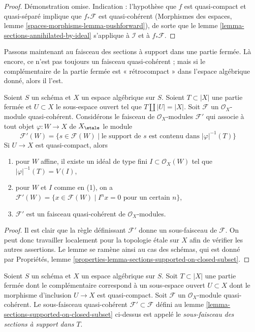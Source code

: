 \begin{proof}
Démonstration omise. Indication : l'hypothèse que $f$ est quasi-compact et
quasi-séparé implique que $f_*\mathcal{F}$ est quasi-cohérent
(Morphismes des espaces, lemme \ref{spaces-morphisms-lemma-pushforward}),
de sorte que le lemme \ref{lemma-sections-annihilated-by-ideal} s'applique
à $\mathcal{I}$ et à $f_*\mathcal{F}$.
\end{proof}

\noindent
Passons maintenant au faisceau des sections à support dans une partie fermée.
Là encore, ce n'est pas toujours un faisceau quasi-cohérent ; mais si le complémentaire
de la partie fermée est « rétrocompact » dans l'espace algébrique donné, alors
il l'est.

\begin{lemma}
\label{lemma-sections-supported-on-closed-subset}
Soient $S$ un schéma et $X$ un espace algébrique sur $S$.
Soient $T \subset |X|$ une partie fermée et $U \subset X$
le sous-espace ouvert tel que $T \amalg |U| = |X|$.
Soit $\mathcal{F}$ un $\mathcal{O}_X$-module quasi-cohérent.
Considérons le faisceau de $\mathcal{O}_X$-modules $\mathcal{F}'$
qui associe à tout objet $\varphi : W \to X$ de
$X_\etale$ le module
$$
\mathcal{F}'(W)
=
\{s \in \mathcal{F}(W) \mid
\text{le support de }s\text{ est contenu dans }|\varphi|^{-1}(T)\}
$$
Si $U \to X$ est quasi-compact, alors
\begin{enumerate}
\item pour $W$ affine, il existe un idéal de type fini
$I \subset \mathcal{O}_X(W)$ tel que $|\varphi|^{-1}(T) = V(I)$,
\item pour $W$ et $I$ comme en (1), on a
$\mathcal{F}'(W) = \{x \in \mathcal{F}(W) \mid
I^nx = 0 \text{ pour un certain } n\}$,
\item $\mathcal{F}'$ est un faisceau quasi-cohérent de $\mathcal{O}_X$-modules.
\end{enumerate}
\end{lemma}

\begin{proof}
Il est clair que la règle définissant $\mathcal{F}'$ donne un sous-faisceau
de $\mathcal{F}$. On peut donc travailler localement pour la topologie étale sur $X$
afin de vérifier les autres assertions. Le lemme se ramène ainsi au cas des schémas,
qui est donné par
Propriétés, lemme \ref{properties-lemma-sections-supported-on-closed-subset}.
\end{proof}

\begin{definition}
\label{definition-subsheaf-sections-supported-on-closed}
Soient $S$ un schéma et $X$ un espace algébrique sur $S$.
Soit $T \subset |X|$ une partie fermée dont le complémentaire
correspond à un sous-espace ouvert $U \subset X$
dont le morphisme d'inclusion $U \to X$ est quasi-compact.
Soit $\mathcal{F}$ un $\mathcal{O}_X$-module quasi-cohérent.
Le sous-faisceau quasi-cohérent $\mathcal{F}' \subset \mathcal{F}$ défini au
lemme \ref{lemma-sections-supported-on-closed-subset} ci-dessus est appelé
le {\it sous-faisceau des sections à support dans $T$}.
\end{definition}

